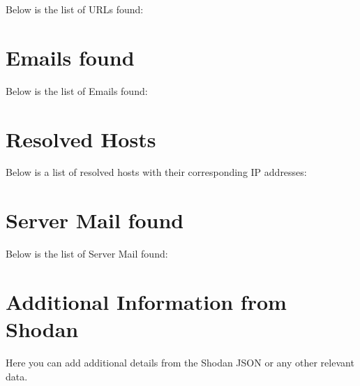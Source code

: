 \documentclass{article}
\begin{document}
Below is the list of URLs found:



\section*{Emails found}

Below is the list of Emails found:


\section*{Resolved Hosts}

Below is a list of resolved hosts with their corresponding IP addresses:


\section*{Server Mail found}

Below is the list of Server Mail found:


\section*{Additional Information from Shodan}

Here you can add additional details from the Shodan JSON or any other relevant data.
\end{document}
